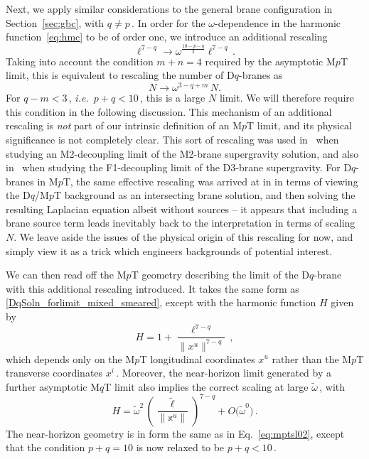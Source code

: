 \documentclass[11pt]{article}
\newcommand{\be}{\begin{equation}}
\newcommand{\ee}{\end{equation}}
\newcommand{\lr}{\left (}
\newcommand{\rr}{\right )}
\renewcommand{\tilde}[1]{\widetilde{#1}}
\renewcommand{\emph}[1]{\textit{#1}}
\newcommand{\lbb}{\tilde{\ell}}
\begin{document}
Next, we apply similar considerations to the general brane configuration in Section~\ref{sec:gbc}, with $q \neq p$\,. In order for the $\omega$-dependence in the harmonic function~\eqref{eq:hmc} to be of order one, we introduce an additional rescaling 
%
\be
    \ell^{7-q} \rightarrow \omega^{\tfrac{10-p-q}{2}} \ell^{7-q}\,.
\ee
%
Taking into account the condition $m+n=4$ required by the asymptotic M$p$T limit, this is equivalent to rescaling the number of D$q$-branes as 
%
\be
    N \rightarrow \omega^{3-q+m} \, N.
\ee 
%
For $q-m<3$\,, \emph{i.e.}~$p + q < 10$\,, this is a large $N$ limit. We will therefore require this condition in the following discussion. 
This mechanism of an additional rescaling is \emph{not} part of our intrinsic definition of an M$p$T limit, and its physical significance is not completely clear. 
This sort of rescaling was used in~\cite{Lambert:2024uue} when studying an M2-decoupling limit of the M2-brane supergravity solution, and also in~\cite{Fontanella:2024rvn} when studying the F1-decoupling limit of the D3-brane supergravity.
For D$q$-branes in M$p$T, the same effective rescaling was arrived at in \cite{Lambert:2024yjk} in terms of viewing the D$q$/M$p$T background as an intersecting brane solution, and then solving the resulting Laplacian equation albeit without sources -- it appears that including a brane source term leads inevitably back to the interpretation in terms of scaling $N$.
We leave aside the issues of the physical origin of this rescaling for now, and simply view it as a trick which engineers backgrounds of potential interest. 

We can then read off the M$p$T geometry describing the limit of the D$q$-brane with this additional rescaling introduced.
It takes the same form as \eqref{DqSoln_forlimit_mixed_smeared}, except with the harmonic function $H$ given by 
%
\be \label{Hlong}
    H = 1 + \frac{\ell^{7-q}}{\|x^u\|^{7-q}} \,,
\ee
%
which depends only on the M$p$T longitudinal coordinates $x^u$ rather than the M$p$T transverse coordinates $x^i$\,. Moreover, the near-horizon limit generated by a further asymptotic M$q$T limit also implies the correct scaling at large $\tilde{\omega}$\,, with
%
\be
    H = \tilde{\omega}^2 \, \lr \frac{\lbb}{\| \mathbb{x}^u \|} \rr^{\!\!7-q} + O\bigl(\tilde{\omega}^0\bigr)\,.
\ee
%
The near-horizon geometry is in form the same as in Eq.~\eqref{eq:mptsl02}, except that the condition $p + q = 10$ is now relaxed to be $p + q < 10$\,. 
\end{document}
